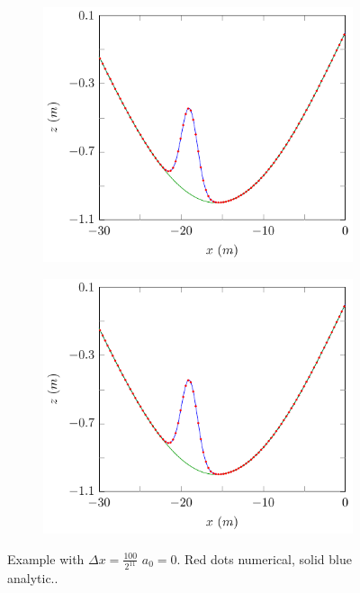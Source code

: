 \begin{figure}
	\centering
	\begin{subfigure}{0.5\textwidth}
		\includegraphics[width=\textwidth]{./chp5/figures/Forced/Dry/exFDVM2.pdf}
	\end{subfigure}%
	\begin{subfigure}{0.5\textwidth}
		\includegraphics[width=\textwidth]{./chp5/figures/Forced/Dry/exFEVM2.pdf}
	\end{subfigure}
	\caption{Example with $\Delta x = \frac{100}{2^{11}}$ $a_0 = 0$. Red dots numerical, solid blue analytic..}
	\label{fig:TravGaussDryexAll}
\end{figure}

